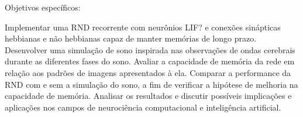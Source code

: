 Objetivos específicos:

Implementar uma RND recorrente com neurônios LIF? e conexões sinápticas hebbianas e não hebbianas capaz de manter memórias de longo prazo.
Desenvolver uma simulação de sono inspirada nas observações de ondas cerebrais durante as diferentes fases do sono.
Avaliar a capacidade de memória da rede em relação aos padrões de imagens apresentados à ela.
Comparar a performance da RND com e sem a simulação do sono, a fim de verificar a hipótese de melhoria na capacidade de memória.
Analisar os resultados e discutir possíveis implicações e aplicações nos campos de neurociência computacional e inteligência artificial.
